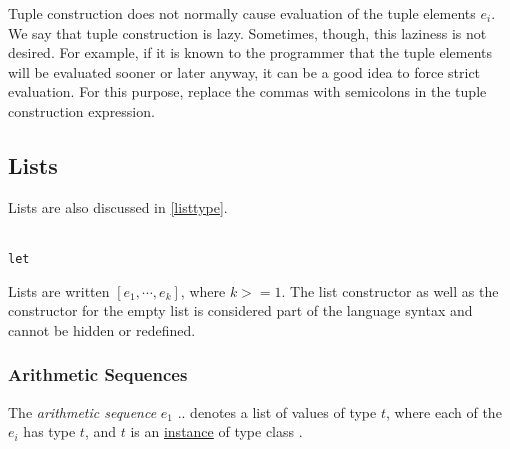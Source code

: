 Tuple construction does not normally cause evaluation of the tuple elements $e_i$. We say that tuple construction is lazy. Sometimes, though, this laziness is not desired. For example, if it is known to the programmer that the tuple elements will be evaluated sooner or later anyway, it can be a good idea to force strict evaluation. For this purpose, replace the commas with semicolons in the tuple construction expression.

\subsection{Lists} \label{listterm} 

Lists are also discussed in \autoref{listtype}.

\begin{flushleft}
 \sym{[]}  
  \alt{} \bracka{}\brackz{}
  \alt{} \bracka{}  \brackz{}  
  \alt{} \bracka{} \sym{$|$} \brackz{} \\
  \term{$\leftarrow$} 
  \alt {}
  \alt  \texttt{let} \bracea{}  \bracez{}\\
\end{flushleft}

Lists are written $[e_1, \cdots, e_k]$, where $k>=1$. The list constructor \sym{:} as well as the constructor for the empty list \sym{[]} is considered part of the language syntax and cannot be hidden or redefined.


\subsubsection{Arithmetic Sequences}  
\label{aseq}

The \emph{arithmetic sequence} \bracka{}$e_1$  .. \brackz{} 
denotes a list of values of type $t$, 
where each of the $e_i$ has type $t$, and $t$ is an \hyperref[instance]{instance} of type class .

